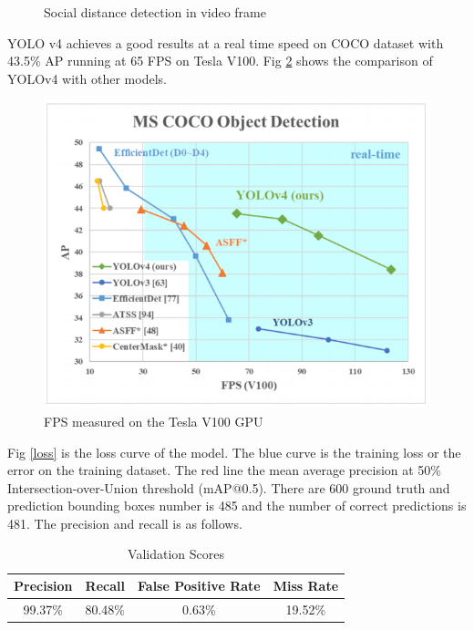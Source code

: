 \documentclass[conference]{IEEEtran}
\begin{document}
\begin{figure}[!h]
\begin{subfigure}[b]{0.8\columnwidth}
		\caption{}
	\end{subfigure}
	\caption{Social distance detection in video frame}
	\label{output}
\end{figure}

\par 
YOLO v4 achieves a good results at a real time speed on COCO dataset \cite{coco} with 43.5\% AP running at 65 FPS on Tesla V100. Fig \ref{fps} shows the comparison of YOLOv4 with other models. 

\begin{figure}[!h]
	\includegraphics[width=\columnwidth]{./images/fps.png}
	\caption{FPS measured on the Tesla V100 GPU}
	\label{fps}
\end{figure}

Fig \ref{loss} is the loss curve of the model. The blue curve is the training loss or the error on the training dataset. The red line the mean average precision at 50\% Intersection-over-Union threshold (mAP@0.5). There are 600 ground truth and prediction bounding boxes number is 485 and the number of correct predictions is 481. The precision and recall is as follows.
\\
\begin{table}[!h]
	\centering
\begin{tabular}{|c|c|c|c|}
	\hline
	\textbf{Precision} & \textbf{Recall} & \textbf{False Positive Rate} & \textbf{Miss Rate} \\
	\hline
	99.37\% & 80.48\% & 0.63\% & 19.52\% \\
	\hline
\end{tabular}
\caption{Validation Scores}
\label{val}  
\end{table}
\end{document}
